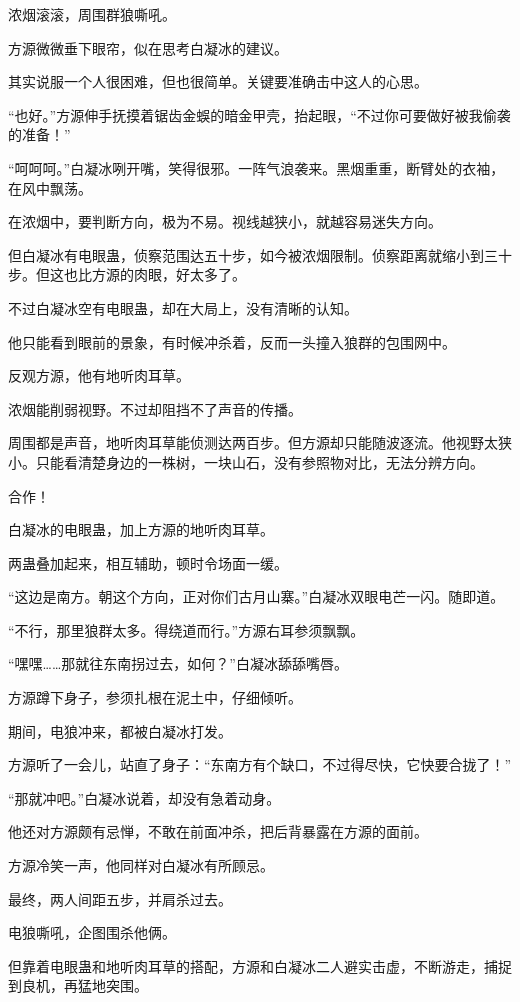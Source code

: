 \begin{this_body}
浓烟滚滚，周围群狼嘶吼。

方源微微垂下眼帘，似在思考白凝冰的建议。

其实说服一个人很困难，但也很简单。关键要准确击中这人的心思。

“也好。”方源伸手抚摸着锯齿金蜈的暗金甲壳，抬起眼，“不过你可要做好被我偷袭的准备！”

“呵呵呵。”白凝冰咧开嘴，笑得很邪。一阵气浪袭来。黑烟重重，断臂处的衣袖，在风中飘荡。

在浓烟中，要判断方向，极为不易。视线越狭小，就越容易迷失方向。

但白凝冰有电眼蛊，侦察范围达五十步，如今被浓烟限制。侦察距离就缩小到三十步。但这也比方源的肉眼，好太多了。

不过白凝冰空有电眼蛊，却在大局上，没有清晰的认知。

他只能看到眼前的景象，有时候冲杀着，反而一头撞入狼群的包围网中。

反观方源，他有地听肉耳草。

浓烟能削弱视野。不过却阻挡不了声音的传播。

周围都是声音，地听肉耳草能侦测达两百步。但方源却只能随波逐流。他视野太狭小。只能看清楚身边的一株树，一块山石，没有参照物对比，无法分辨方向。

合作！

白凝冰的电眼蛊，加上方源的地听肉耳草。

两蛊叠加起来，相互辅助，顿时令场面一缓。

“这边是南方。朝这个方向，正对你们古月山寨。”白凝冰双眼电芒一闪。随即道。

“不行，那里狼群太多。得绕道而行。”方源右耳参须飘飘。

“嘿嘿……那就往东南拐过去，如何？”白凝冰舔舔嘴唇。

方源蹲下身子，参须扎根在泥土中，仔细倾听。

期间，电狼冲来，都被白凝冰打发。

方源听了一会儿，站直了身子：“东南方有个缺口，不过得尽快，它快要合拢了！”

“那就冲吧。”白凝冰说着，却没有急着动身。

他还对方源颇有忌惮，不敢在前面冲杀，把后背暴露在方源的面前。

方源冷笑一声，他同样对白凝冰有所顾忌。

最终，两人间距五步，并肩杀过去。

电狼嘶吼，企图围杀他俩。

但靠着电眼蛊和地听肉耳草的搭配，方源和白凝冰二人避实击虚，不断游走，捕捉到良机，再猛地突围。


\end{this_body}
